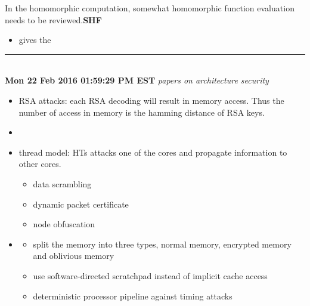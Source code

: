 \documentclass[]{article}
\begin{document}
In the homomorphic computation, somewhat homomorphic function evaluation needs to be reviewed.\textbf{SHF}
\begin{itemize}
	\item \cite{chen2015execution} gives the 
\end{itemize}

\rule[-0.1cm]{7.5in}{0.01cm}\\
\noindent \textbf{Mon 22 Feb 2016 01:59:29 PM EST}
\textit{papers on architecture security}
\begin{itemize}
	\item \cite{wang2014timing} RSA attacks: each RSA decoding will result in
memory access. Thus the number of access in memory is the hamming distance of
RSA keys.
	\item \cite{ismail2015improving} 
	\item \cite{ancajas2014fort} thread model: HTs attacks one of the cores and
propagate information to other cores.  
        \begin{itemize}
            \item data scrambling
            \item dynamic packet certificate
            \item node obfuscation
        \end{itemize}
    \item \cite{liu2015ghostrider} 
        \begin{itemize}
            \item split the memory into three types, normal memory, encrypted memory and oblivious memory
            \item use software-directed scratchpad instead of implicit cache access
            \item deterministic processor pipeline against timing attacks
        \end{itemize}
\end{itemize}
\end{document}
